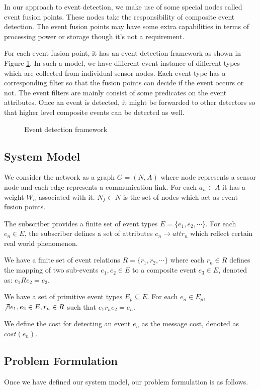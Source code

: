 In our approach to event detection, we make use of some special nodes called event fusion points. These nodes take the responsibility of composite event detection. The event fusion points may have some extra capabilities in terms of processing power or storage though it's not a requirement.

For each event fusion point, it has an event detection framework as shown in Figure \ref{fig:eventdetectionframework2}. In such a model, we have different event instance of different types which are collected from individual sensor nodes. Each event type has a corresponding filter so that the fusion points can decide if the event occurs or not. The event filters are mainly consist of some predicates on the event attributes. Once an event is detected, it might be forwarded to other detectors so that higher level composite events can be detected as well.

\begin{figure}
\centering
{}
\caption{Event detection framework}
\label{fig:eventdetectionframework2}
\end{figure}

\subsection{System Model}
We consider the network as a graph \(G=(N, A)\) where node represents a sensor node and each edge represents a communication link. For each \(a_n\in A\) it has a weight \(W_n\) associated with it. \(N_f\subset N\) is the set of nodes which act as event fusion points.

The subscriber provides a finite set of event types \(E=\{e_1,e_2,\cdots\}\). For each \(e_n\in E\), the subscriber defines a set of attributes \(e_n\rightarrow attr_n\) which reflect certain real world phenomenon. 

We have a finite set of event relations \(R=\{r_1,r_2, \cdots\}\) where each \(r_n\in R\) defines the mapping of two sub-events \(e_1, e_2\in E\) to a composite event \(e_3\in E\), denoted as: \(e_1Re_2=e_3\).

We have a set of primitive event types \(E_p\subseteq E\). For each \(e_n\in E_p\), \(\not\exists e_1, e_2\in E, r_n\in R\) such that \(e_1 r_n e_2=e_n\).

We define the cost for detecting an event \(e_n\) as the message cost, denoted as \(cost(e_n)\).

\subsection{Problem Formulation}
Once we have defined our system model, our problem formulation is as follows.

